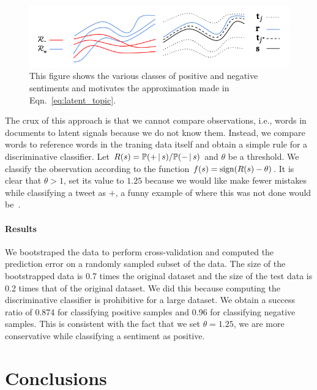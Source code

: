 \documentclass[11pt, letterpaper, conference, final, twocolumn]{ieeeconf}
\begin{document}
\begin{figure}
\centering
\includegraphics[width=\columnwidth]{fig/latent_topics}
\caption{This figure shows the various classes of positive and negative sentiments and motivates the approximation made in Eqn.~\eqref{eq:latent_topic}.}
\label{fig:latent_topics}
\end{figure}

The crux of this approach is that we cannot compare observations, i.e., words in documents to latent signals because we do not know them. Instead, we compare words to reference words in the traning data itself and obtain a simple rule for a discriminative classifier. Let $R(s) = \mathbb{P}(+ \, \vert \, s)/\mathbb{P}(- \, \vert \, s)$ and $\theta$ be a threshold. We classify the observation according to the function $f(s) = \textrm{sign}(R(s) - \theta)$. It is clear that $\theta > 1$, set its value to $1.25$ because we would like make fewer mistakes while classifying a tweet as $+$, a funny example of where this was not done would be~\cite{target_pregnant}.

\paragraph{Results}
We bootstraped the data to perform cross-validation and computed the prediction error on a randomly sampled subset of the data. The size of the bootstrapped data is 0.7 times the original dataset and the size of the test data is 0.2 times that of the original dataset. We did this because computing the discriminative classifier is prohibitive for a large dataset. We obtain a success ratio of 0.874 for classifying positive samples and 0.96 for classifying negative samples. This is consistent with the fact that we set $\theta = 1.25$, we are more conservative while classifying a sentiment as positive.

\section{Conclusions}
\label{sec:conclusions}



\end{document}
